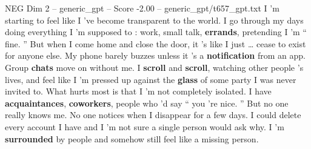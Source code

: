 \begin{textsample}{NEG Dim 2 – generic\_gpt – Score -2.00 – generic\_gpt/t657\_gpt.txt}  \label{ex:f2_neg_005}
I ’m starting to feel like I ’ve become transparent to the world.
I go through my days doing everything I ’m supposed to : work, small talk, \textbf{errands}, pretending I ’m “ fine. ” But when I come home and close the door, it ’s like I just … cease to exist for anyone else.
My phone barely buzzes unless it ’s a \textbf{notification} from an app.
Group \textbf{chats} move on without me.
I \textbf{scroll} and \textbf{scroll}, watching other people ’s lives, and feel like I ’m pressed up against the \textbf{glass} of some party I was never invited to.
What hurts most is that I ’m not completely isolated.
I have \textbf{acquaintances}, \textbf{coworkers}, people who ’d say “ you ’re nice. ” But no one really knows me.
No one notices when I disappear for a few days.
I could delete every account I have and I ’m not sure a single person would ask why.
I ’m \textbf{surrounded} by people and somehow still feel like a missing person.

\end{textsample}
